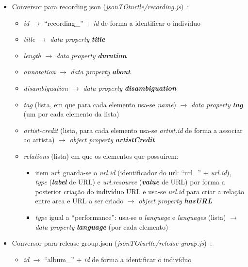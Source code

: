 \documentclass{article}
\begin{document}
\begin{itemize}
\begin{itemize}
        \end{itemize}
    \item Conversor para recording.json (\textit{jsonTOturtle/recording.js})~\cite{mbRec}:
        \begin{itemize}
            \item \textit{id} $\to$ ``recording\_'' + \textit{id} de forma a identificar o indivíduo
            \item \textit{title} $\to$ \textit{data property} \textit{\textbf{title}}
            \item \textit{length} $\to$ \textit{data property} \textit{\textbf{duration}}
            \item \textit{annotation} $\to$ \textit{data property} \textit{\textbf{about}}
            \item \textit{disambiguation} $\to$ \textit{data property} \textit{\textbf{disambiguation}}
            \item \textit{tag} (lista, em que para cada elemento usa-se \textit{name}) $\to$ \textit{data property} \textit{\textbf{tag}} (um por cada elemento da lista)
            \item \textit{artist-credit} (lista, para cada elemento usa-se \textit{artist.id} de forma a associar ao artista) $\to$ \textit{object property} \textit{\textbf{artistCredit}}
            \item \textit{relations} (lista) em que os elementos que possuirem:
                \begin{itemize}
                    \item item \textit{url}: guarda-se o \textit{url.id} (identificador do url: ``url\_'' + \textit{url.id}), \textit{type} (\textit{\textbf{label}} de URL) e \textit{url.resource} (\textit{\textbf{value}} de URL) por forma a posterior criação do indivíduo URL e usa-se \textit{url.id} para criar a relação entre area e URL a ser criado $\to$ \textit{object property} \textit{\textbf{hasURL}}
                    \item \textit{type} igual a ``performance'': usa-se o \textit{language} e \textit{languages} (lista) $\to$ \textit{data property} \textit{\textbf{language}} (por cada elemento)
                \end{itemize}
        \end{itemize}
    \item Conversor para release-group.json (\textit{jsonTOturtle/release-group.js})~\cite{mbReGp}:
        \begin{itemize}
            \item \textit{id} $\to$ ``album\_'' + \textit{id} de forma a identificar o indivíduo

\end{itemize}
\end{itemize}
\end{document}
